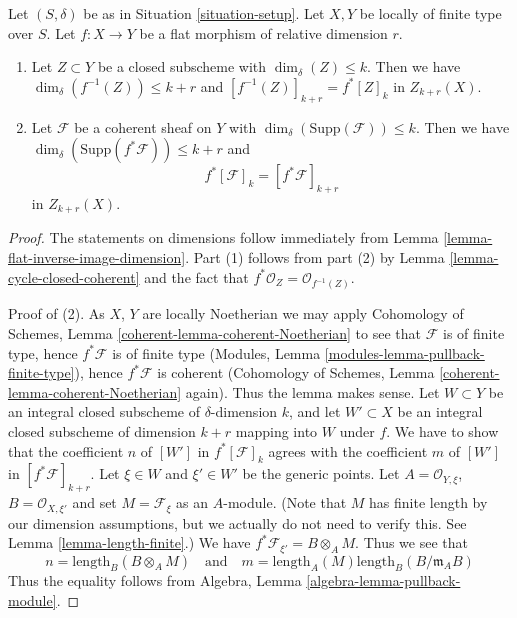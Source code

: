 \begin{lemma}
\label{lemma-pullback-coherent}
Let $(S, \delta)$ be as in Situation \ref{situation-setup}.
Let $X, Y$ be locally of finite type over $S$.
Let $f : X \to Y$ be a flat morphism of relative dimension $r$.
\begin{enumerate}
\item Let $Z \subset Y$ be a closed subscheme with
$\dim_\delta(Z) \leq k$. Then we have
$\dim_\delta(f^{-1}(Z)) \leq k + r$
and $[f^{-1}(Z)]_{k + r} = f^*[Z]_k$ in $Z_{k + r}(X)$.
\item Let $\mathcal{F}$ be a coherent sheaf on $Y$ with
$\dim_\delta(\text{Supp}(\mathcal{F})) \leq k$.
Then we have $\dim_\delta(\text{Supp}(f^*\mathcal{F})) \leq k + r$
and
$$
f^*[{\mathcal F}]_k = [f^*{\mathcal F}]_{k+r}
$$
in $Z_{k + r}(X)$.
\end{enumerate}
\end{lemma}

\begin{proof}
The statements on dimensions follow immediately from
Lemma \ref{lemma-flat-inverse-image-dimension}.
Part (1) follows from part (2) by Lemma \ref{lemma-cycle-closed-coherent}
and the fact that $f^*\mathcal{O}_Z = \mathcal{O}_{f^{-1}(Z)}$.

\medskip\noindent
Proof of (2).
As $X$, $Y$ are locally Noetherian we may apply
Cohomology of Schemes, Lemma \ref{coherent-lemma-coherent-Noetherian} to see
that $\mathcal{F}$ is of finite type, hence $f^*\mathcal{F}$ is
of finite type (Modules, Lemma \ref{modules-lemma-pullback-finite-type}),
hence $f^*\mathcal{F}$ is coherent
(Cohomology of Schemes, Lemma \ref{coherent-lemma-coherent-Noetherian} again).
Thus the lemma makes sense. Let $W \subset Y$ be an integral closed
subscheme of $\delta$-dimension $k$, and let $W' \subset X$ be
an integral closed subscheme of dimension $k + r$ mapping into $W$
under $f$. We have to show that the coefficient $n$ of
$[W']$ in $f^*[{\mathcal F}]_k$ agrees with the coefficient
$m$ of $[W']$ in $[f^*{\mathcal F}]_{k+r}$. Let $\xi \in W$ and
$\xi' \in W'$ be the generic points. Let
$A = \mathcal{O}_{Y, \xi}$, $B = \mathcal{O}_{X, \xi'}$
and set $M = \mathcal{F}_\xi$ as an $A$-module. (Note that
$M$ has finite length by our dimension assumptions, but we
actually do not need to verify this. See
Lemma \ref{lemma-length-finite}.)
We have $f^*\mathcal{F}_{\xi'} = B \otimes_A M$.
Thus we see that
$$
n = \text{length}_B(B \otimes_A M)
\quad
\text{and}
\quad
m = \text{length}_A(M) \text{length}_B(B/\mathfrak m_AB)
$$
Thus the equality follows from
Algebra, Lemma \ref{algebra-lemma-pullback-module}.
\end{proof}



